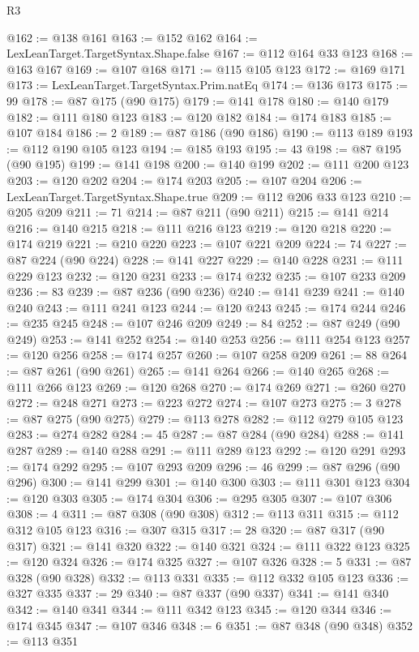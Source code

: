 \begin{lexlean}{R3}
\begin{coremodule}
@162 := @138 @161
@163 := @152 @162
@164 := LexLeanTarget.TargetSyntax.Shape.false
@167 := @112 @164 @33 @123
@168 := @163 @167
@169 := @107 @168
@171 := @115 @105 @123
@172 := @169 @171
@173 := LexLeanTarget.TargetSyntax.Prim.natEq
@174 := @136 @173
@175 := 99
@178 := @87 @175 (@90 @175)
@179 := @141 @178
@180 := @140 @179
@182 := @111 @180 @123
@183 := @120 @182
@184 := @174 @183
@185 := @107 @184
@186 := 2
@189 := @87 @186 (@90 @186)
@190 := @113 @189
@193 := @112 @190 @105 @123
@194 := @185 @193
@195 := 43
@198 := @87 @195 (@90 @195)
@199 := @141 @198
@200 := @140 @199
@202 := @111 @200 @123
@203 := @120 @202
@204 := @174 @203
@205 := @107 @204
@206 := LexLeanTarget.TargetSyntax.Shape.true
@209 := @112 @206 @33 @123
@210 := @205 @209
@211 := 71
@214 := @87 @211 (@90 @211)
@215 := @141 @214
@216 := @140 @215
@218 := @111 @216 @123
@219 := @120 @218
@220 := @174 @219
@221 := @210 @220
@223 := @107 @221 @209
@224 := 74
@227 := @87 @224 (@90 @224)
@228 := @141 @227
@229 := @140 @228
@231 := @111 @229 @123
@232 := @120 @231
@233 := @174 @232
@235 := @107 @233 @209
@236 := 83
@239 := @87 @236 (@90 @236)
@240 := @141 @239
@241 := @140 @240
@243 := @111 @241 @123
@244 := @120 @243
@245 := @174 @244
@246 := @235 @245
@248 := @107 @246 @209
@249 := 84
@252 := @87 @249 (@90 @249)
@253 := @141 @252
@254 := @140 @253
@256 := @111 @254 @123
@257 := @120 @256
@258 := @174 @257
@260 := @107 @258 @209
@261 := 88
@264 := @87 @261 (@90 @261)
@265 := @141 @264
@266 := @140 @265
@268 := @111 @266 @123
@269 := @120 @268
@270 := @174 @269
@271 := @260 @270
@272 := @248 @271
@273 := @223 @272
@274 := @107 @273
@275 := 3
@278 := @87 @275 (@90 @275)
@279 := @113 @278
@282 := @112 @279 @105 @123
@283 := @274 @282
@284 := 45
@287 := @87 @284 (@90 @284)
@288 := @141 @287
@289 := @140 @288
@291 := @111 @289 @123
@292 := @120 @291
@293 := @174 @292
@295 := @107 @293 @209
@296 := 46
@299 := @87 @296 (@90 @296)
@300 := @141 @299
@301 := @140 @300
@303 := @111 @301 @123
@304 := @120 @303
@305 := @174 @304
@306 := @295 @305
@307 := @107 @306
@308 := 4
@311 := @87 @308 (@90 @308)
@312 := @113 @311
@315 := @112 @312 @105 @123
@316 := @307 @315
@317 := 28
@320 := @87 @317 (@90 @317)
@321 := @141 @320
@322 := @140 @321
@324 := @111 @322 @123
@325 := @120 @324
@326 := @174 @325
@327 := @107 @326
@328 := 5
@331 := @87 @328 (@90 @328)
@332 := @113 @331
@335 := @112 @332 @105 @123
@336 := @327 @335
@337 := 29
@340 := @87 @337 (@90 @337)
@341 := @141 @340
@342 := @140 @341
@344 := @111 @342 @123
@345 := @120 @344
@346 := @174 @345
@347 := @107 @346
@348 := 6
@351 := @87 @348 (@90 @348)
@352 := @113 @351

\end{coremodule}
\end{lexlean}
